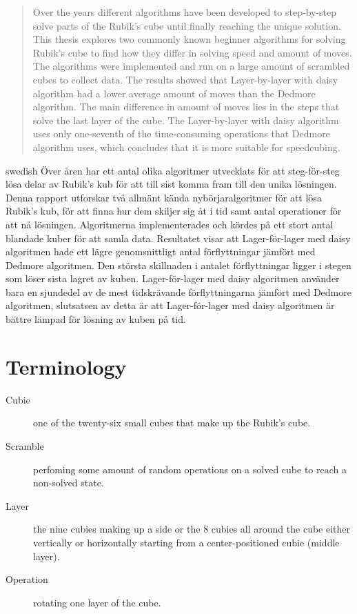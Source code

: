 \documentclass[a4paper,11pt]{kth-mag}
\begin{document}

\pagestyle{empty}
\removepagenumbers
{}
\begin{abstract}
 Over the years different algorithms have been developed to step-by-step solve parts of the Rubik's cube until finally reaching the unique solution. This thesis explores two commonly known beginner algorithms for solving Rubik’s cube to find how they differ in solving speed and amount of moves. The algorithms were implemented and run on a large amount of scrambled cubes to collect data. The results showed that Layer-by-layer with daisy algorithm had a lower average amount of moves than the Dedmore algorithm. The main difference in amount of moves lies in the steps that solve the last layer of the cube. The Layer-by-layer with daisy algorithm uses only one-seventh of the time-consuming operations that Dedmore algorithm uses, which concludes that it is more suitable for speedcubing. 


  


\end{abstract}
\clearpage
\begin{foreignabstract}{swedish}
  Över åren har ett antal olika algoritmer utvecklats för att steg-för-steg lösa delar av Rubik's kub för att till sist komma fram till den unika lösningen. Denna rapport utforskar två allmänt kända nybörjaralgoritmer för att lösa Rubik's kub, för att finna hur dem skiljer sig åt i tid samt antal operationer för att nå lösningen. Algoritmerna implementerades och kördes på ett stort antal blandade kuber för att samla data. Resultatet visar att Lager-för-lager med daisy algoritmen hade ett lägre genomsnittligt antal förflyttningar jämfört med Dedmore algoritmen. Den största skillnaden i antalet förflyttningar ligger i stegen som löser sista lagret av kuben. Lager-för-lager med daisy algoritmen använder bara en sjundedel av de mest tidskrävande förflyttningarna jämfört med Dedmore algoritmen, slutsatsen av detta är att Lager-för-lager med daisy algoritmen är bättre lämpad för lösning av kuben på tid.  
\end{foreignabstract}

\clearpage
\tableofcontents*
\mainmatter
\section{Terminology} 
	\begin{description}
		\item[Cubie] one of the twenty-six small cubes that make up the Rubik's cube.
		\item[Scramble] perfoming some amount of random operations on a solved cube to reach a non-solved state.
		\item[Layer] the nine cubies making up a side or the 8 cubies all around the cube either vertically or horizontally starting from a center-positioned cubie (middle layer).
		\item[Operation] rotating one layer of the cube.
	\end{description}
\end{document}
